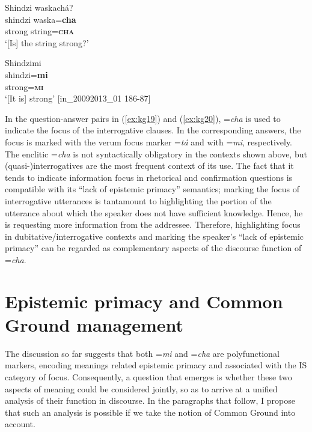 \documentclass[output=paper]{langscibook}
\begin{document}
\begin{exe}
	\ex \label{ex:kg20}
	\begin{xlist}
		\ex \label{ex:kg20a}
		\glll Shindzi waskachá?\\
		shindzi waska=\textbf{cha}\\
		strong	string=\textbf{\textsc{cha}}\\
		\trans ‘[Is] the string strong?’
		
		\ex  \label{ex:kg20b}
		\glll Shindzimi\\
		shindzi=\textbf{mi}\\
        strong=\textbf{\textsc{mi}}\\
        \trans ‘[It is] strong’ [in\_20092013\_01    186-87]
	\end{xlist}
\end{exe}

In the question-answer pairs in (\ref{ex:kg19}) and (\ref{ex:kg20}), =\textit{cha} is used to indicate the focus of the interrogative clauses. In the corresponding answers, the focus is marked with the verum focus marker =\textit{tá} and with =\textit{mi}, respectively. The enclitic =\textit{cha} is not syntactically obligatory in the contexts shown above, but (quasi-)interrogatives are the most frequent context of its use. The fact that it tends to indicate information focus in rhetorical and confirmation questions is compatible with its “lack of epistemic primacy” semantics; marking the focus of interrogative utterances is tantamount to highlighting the portion of the utterance about which the speaker does not have sufficient knowledge. Hence, he is requesting more information from the addressee. Therefore, highlighting focus in dubitative/interrogative contexts and marking the speaker’s “lack of epistemic primacy” can be regarded as complementary aspects of the discourse function of =\textit{cha}.

\section{Epistemic primacy and Common Ground management}\label{s:kg5}

The discussion so far suggests that both =\textit{mi} and =\textit{cha} are polyfunctional markers, encoding meanings related epistemic primacy and associated with the IS category of focus. Consequently, a question that emerges is whether these two aspects of meaning could be considered jointly, so as to arrive at a unified analysis of their function in discourse. In the paragraphs that follow, I propose that such an analysis is possible if we take the notion of Common Ground into account.
\end{document}
